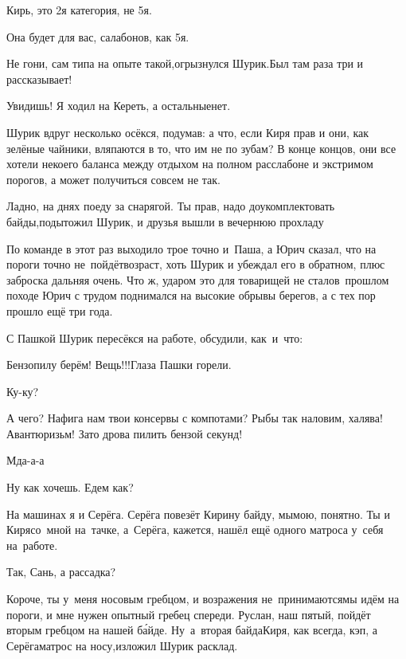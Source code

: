 \diagdash Кирь, это 2\sdash я категория, не 5\sdash я.

\diagdash Она будет для вас, салабонов, как 5\sdash я.

\diagdash Не гони, сам типа на опыте такой,\mdash огрызнулся Шурик.\mdash Был там раза три и рассказывает!

\diagdash Увидишь! Я ходил на Кереть, а остальные\mdash нет.

Шурик вдруг несколько осёкся, подумав: а что, если Киря прав и они, как зелёные чайники, вляпаются в то, что им не по зубам? В конце концов, они все хотели некоего баланса между отдыхом на полном расслабоне и экстримом порогов, а может получиться совсем не так. 

\diagdash Ладно, на днях поеду за снарягой. Ты прав, надо доукомплектовать байды,\mdash подытожил Шурик, и друзья вышли в вечернюю прохладу\myldots{}

\myldots{}По команде в этот раз выходило трое точно и~Паша, а Юрич сказал, что на пороги точно не~пойдёт\mdash возраст, хоть Шурик и убеждал его в обратном, плюс заброска дальняя очень. Что ж, ударом это для товарищей не стало\mdash в~прошлом походе Юрич с трудом поднимался на высокие обрывы берегов, а с тех пор прошло ещё три года.

С Пашкой Шурик пересёкся на работе, обсудили, как~и~что:

\diagdash Бензопилу берём! Вещь!!!\mdash Глаза Пашки горели.

\diagdash Ку-ку?

\diagdash А чего? Нафига нам твои консервы с компотами? Рыбы так наловим, халява! Авантюризьм! Зато дрова пилить бензой секунд!

\diagdash Мда-а-а\myldots{}

\diagdash Ну как хочешь. Едем как?

\diagdash На машинах я и Серёга. Серёга повезёт Кирину байду, мы\mdash мою, понятно. Ты и Киря\mdash со~мной на~тачке, а~Серёга, кажется, нашёл ещё одного матроса у~себя на~работе.

\diagdash Так, Сань, а рассадка?

\diagdash Короче, ты у~меня носовым гребцом, и возражения не~принимаются\mdash мы идём на пороги, и мне нужен опытный гребец спереди. Руслан, наш пятый, пойдёт вторым гребцом на нашей б\'{а}йде. Ну~а~вторая байда\mdash Киря, как всегда, кэп, а Серёга\mdash матрос на носу,\mdash изложил Шурик расклад.

